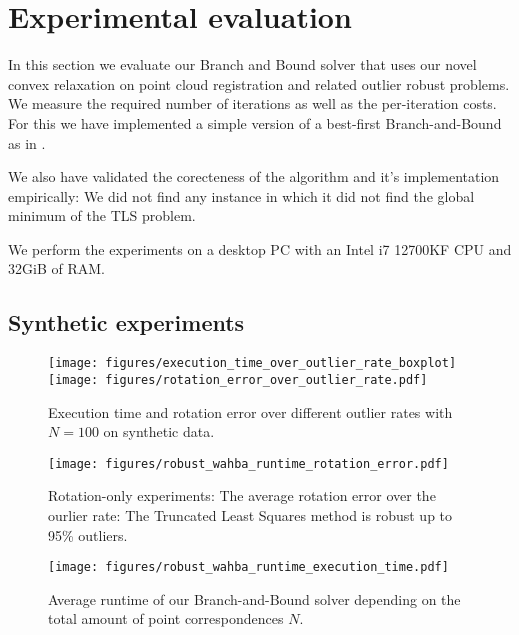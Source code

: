 
\section{Experimental evaluation}
\label{sec:evaluation}
In this section we evaluate our Branch and Bound solver that uses our novel convex relaxation on point cloud registration and related outlier robust problems. 
We measure the required number of iterations as well as the per-iteration costs. For this we have implemented a simple version of a best-first Branch-and-Bound as in \cite{10.1007/978-3-642-37444-9_42}.

We also have validated the corecteness of the algorithm and it's implementation empirically: We did not find any instance in which it did not find the global minimum of the TLS problem.

We perform the experiments on a desktop PC with an Intel i7 12700KF CPU and 32GiB of RAM.

\subsection{Synthetic experiments}
\begin{figure}[!ht]
	\centering
	\texttt{[image: figures/execution\_time\_over\_outlier\_rate\_boxplot]}
	\texttt{[image: figures/rotation\_error\_over\_outlier\_rate.pdf]}
	\caption{Execution time and rotation error over different outlier rates with $N=100$ on synthetic data.}
	\label{fig:execution-time-over-outlier-rate}
\end{figure}


\begin{figure}[!ht]
	\centering
	\begin{adjustbox}{width=1.\linewidth}
		\texttt{[image: figures/robust\_wahba\_runtime\_rotation\_error.pdf]}
	\end{adjustbox}
	\caption{Rotation-only experiments: The average rotation error over the ourlier rate: The Truncated Least Squares method is robust up to 95\% outliers.}
	\label{fig:rotation-error-over-outlier-rate}
\end{figure}


\begin{figure}[!ht]
	\centering
	\begin{adjustbox}{width=1.\linewidth}
		\texttt{[image: figures/robust\_wahba\_runtime\_execution\_time.pdf]}
	\end{adjustbox}
	\caption{Average runtime of our Branch-and-Bound solver depending on the total amount of point correspondences $N$.}
	\label{fig:runtime}
\end{figure}


